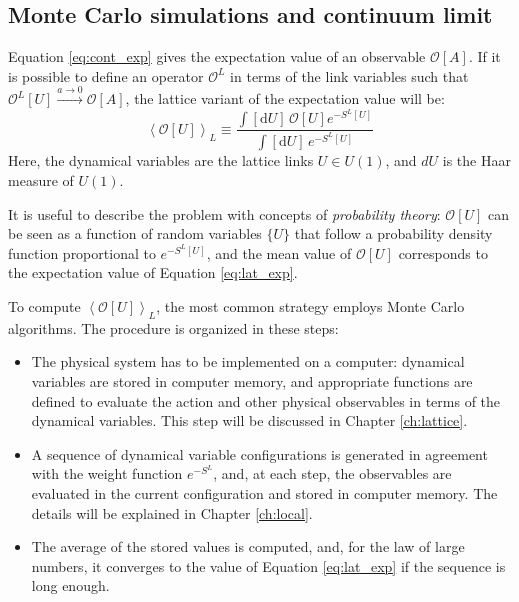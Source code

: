 \subsection*{Monte Carlo simulations and continuum limit}

Equation \eqref{eq:cont_exp} gives the expectation value of an observable $\mathcal O[A]$.
If it is possible to define an operator $\mathcal O^L$ in terms of the link variables such that $\mathcal O^L[U] \xrightarrow{a\to0} \mathcal O[A]$,
the lattice variant of the expectation value will be:
\begin{equation}\label{eq:lat_exp}
    \left<\mathcal O[U]\right>_L \equiv \frac{\int[\mathrm dU]\, \mathcal O[U] e^{-S^L[U]}}{\int[\mathrm dU]\,e^{-S^L[U]}}
\end{equation}
Here, the dynamical variables are the lattice links $U \in U(1)$, and $dU$ is the Haar measure of $U(1)$.

It is useful to describe the problem with concepts of \emph{probability theory}:
$\mathcal O[U]$ can be seen as a function of random variables $\{U\}$ that follow a probability density function proportional to $e^{-S^L[U]}$,
and the mean value of $\mathcal O[U]$ corresponds to the expectation value of Equation \eqref{eq:lat_exp}.

To compute $\left<\mathcal O[U]\right>_L$, the most common strategy employs Monte Carlo algorithms.
The procedure is organized in these steps:
\begin{itemize}
    \item The physical system has to be implemented on a computer: dynamical variables are stored in computer memory,
        and appropriate functions are defined to evaluate the action and other physical observables in terms of the dynamical variables.
        This step will be discussed in Chapter \ref{ch:lattice}.
    \item A sequence of dynamical variable configurations is generated in agreement with the weight function $e^{-S^L}$, and, at each step,
        the observables are evaluated in the current configuration and stored in computer memory. The details will be explained in Chapter \ref{ch:local}.
    \item The average of the stored values is computed, and, for the law of large numbers,
        it converges to the value of Equation \ref{eq:lat_exp} if the sequence is long enough.
\end{itemize}

